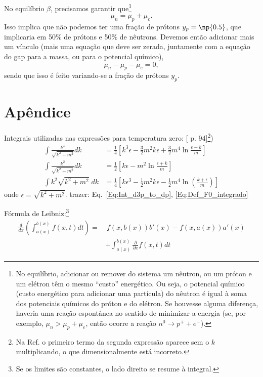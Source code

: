 No equilíbrio $\beta$, precisamos garantir que\footnote{No equilíbrio, adicionar ou remover do sistema um nêutron, ou um próton e um elétron têm o mesmo ``custo'' energético. Ou seja, o potencial químico (custo energético para adicionar uma partícula) do nêutron é igual à soma dos potenciais químicos do próton e do elétron. Se houvesse alguma diferença, haveria uma reação espontânea no sentido de minimizar a energia (se, por exemplo, $\mu_n > \mu_p + \mu_e$, então ocorre a reação $n^0 \to p^+ + e^-$).}
\begin{equation}
	\mu_n = \mu_p + \mu_e.
\end{equation}
%
Isso implica que não podemos ter uma fração de prótons $y_p = \np{0.5}$, que implicaria em 50\% de prótons e 50\% de nêutrons. Devemos então adicionar mais um vínculo (mais uma equação que deve ser zerada, juntamente com a equação do gap para a massa, ou para o potencial químico),
\begin{equation}
	\mu_n - \mu_p - \mu_e = 0,
\end{equation}
%
sendo que isso é feito variando-se a fração de prótons $y_p$.

\section{Apêndice}

Integrais utilizadas nas expressões para temperatura zero: [\parencite{Glendenning} p. 94]\footnote{Na Ref. o primeiro termo da segunda expressão aparece sem o $k$ multiplicando, o que dimensionalmente está incorreto.})
\begin{align}
	\int \frac{k^4}{\sqrt{k^2 + m^2}} dk &= \frac{1}{4}\left[k^3\epsilon - \frac{3}{2} m^2k\epsilon + \frac{3}{2}m^4\ln\frac{\epsilon + k}{m} \right] \label{Eq:Integ_momento_quarta}\\
	\int \frac{k^2}{\sqrt{k^2 + m^2}} dk &= \frac{1}{2}\left[k\epsilon - m^2\ln\frac{\epsilon + k}{m}\right] \label{Eq:Integ_momento_quad} \\
	\int k^2 \sqrt{k^2 + m^2} \;dk &= \frac{1}{4}\left[k \epsilon^3 - \frac{1}{2} m^2 k \epsilon - \frac{1}{2} m^4\ln\left(\frac{k+\epsilon}{m}\right)\right] \label{Eq:Def_F_E}
\end{align}
%
onde $\epsilon = \sqrt{k^2+m^2}$. 
trazer: Eq.~\ref{Eq:Int_d3p_to_dp}, \eqref{Eq:Def_F0_integrado}

Fórmula de Leibniz:\footnote{Se os limites são constantes, o lado direito se resume à integral.}
\begin{equation}\label{Eq:Form_Leibniz}
\begin{split}
	\frac{d}{dx} \left(\int_{a(x)}^{b(x)} f(x,t) dt\right) =&~ f(x, b(x))b'(x) - f(x, a(x))a'(x) \\
	&+ \int_{a(x)}^{b(x)}\frac{\partial}{\partial x}f(x,t) dt
\end{split}
\end{equation}

